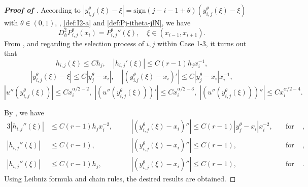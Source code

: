 \documentclass{amsart}
\theoremstyle{definition}
\theoremstyle{remark}
\numberwithin{equation}{section}
\begin{document}
\begin{proof} [\bf Proof of ]
  According to \(|y_{i,j}^\theta(\xi) - \xi| = \text{sign}(j-i-1+\theta) (y_{i,j}^\theta(\xi) - \xi)\) with $\theta\in(0,1)$, , \eqref{def:I2-a} and \eqref{def:Pj-itheta-jlN}, we have
  \begin{equation*}
    D_h^2 {P_{i,j}^\theta}(x_i) = {P_{i,j}^\theta}''(\xi), \quad \xi\in (x_{i-1}, x_{i+1}).
  \end{equation*}
  From , and 
  regarding the selection process of $i,j$ within Case 1-3, it turns out that
  \begin{equation*}
    h_{i,j}(\xi) \le C h_j, \quad |h_{i,j}'(\xi)| \le C(r-1) h_j x_i^{-1},
  \end{equation*}
  \begin{equation*}
    |y_{i,j}^\theta(\xi) - \xi| \le C |y_j^\theta - x_i|, \quad 
    \left|(y_{i.j}^\theta(\xi) - x_i)'\right| \le C |y_j^\theta - x_i| x_i^{-1},
  \end{equation*}
  \begin{equation*}
    \left|u''(y_{i,j}^\theta(\xi))\right| \le C x_i^{\alpha/2-2}, \;
    \left|\left(u''(y_{i,j}^\theta(\xi))\right)'\right| \le C x_i^{\alpha/2-3}, \; 
    \left|\left(u''(y_{i,j}^\theta(\xi))\right)''\right| \le C x_i^{\alpha/2-4}.
  \end{equation*}

  
  By , we have
  \begin{alignat*}{3}
    |h_{i,j}''(\xi)| &\le C(r-1) h_j x_i^{-2}, \quad
    &&\left|(y_{i,j}^\theta(\xi) - x_i)''\right| \le C(r-1) |y_j^\theta - x_i| x_i^{-2}, \quad&\text{for Case 1}, \\
    |h_{i,j}''(\xi)| &\le C(r-1), \quad    
    &&\left|(y_{i,j}^\theta(\xi) - x_i)''\right| \le C(r-1), \quad&\text{for Case 2},   \\
    |h_{i,j}''(\xi)| &\le C(r-1) h_j, \quad
    &&\left|(y_{i,j}^\theta(\xi) - x_i)''\right| \le C(r-1), \quad&\text{for Case 3}.
  \end{alignat*}
  Using Leibniz formula and chain rules, the desired results are obtained.
\end{proof}
\end{document}

